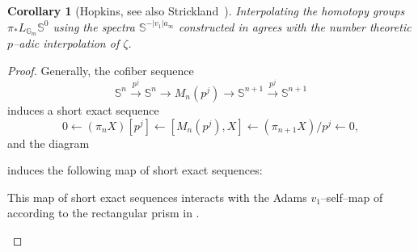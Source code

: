 \documentclass{amsart}
\renewcommand{\S}{\mathbb S}
\newcommand{\G}{\mathbb G}
\newcommand{\<}{\langle}
\renewcommand{\>}{\rangle}
\theoremstyle{plain}
\newtheorem*{corollary}{Corollary}
\theoremstyle{definition}
\theoremstyle{remark}
\begin{document}
\begin{corollary}[{Hopkins, see also Strickland~\cite{StricklandInterpolate}}]
Interpolating the homotopy groups $\pi_* L_{\G_m} \S^0$ using the spectra $\S^{-|v_1|a_\infty}$ constructed in  agrees with the number theoretic $p$--adic interpolation of $\zeta$.
\end{corollary}
\begin{proof}
Generally, the cofiber sequence \[\S^n \xrightarrow{p^j} \S^n \to M_n(p^j) \to \S^{n+1} \xrightarrow{p^j} \S^{n+1}\] induces a short exact sequence \[0 \leftarrow (\pi_n X) [p^j] \leftarrow [M_n(p^j), X] \leftarrow (\pi_{n+1} X) / p^j \leftarrow 0,\] and the diagram
\begin{center}
\end{center}
induces the following map of short exact sequences:
\begin{center}
\end{center}
This map of short exact sequences interacts with the Adams $v_1$--self--map of  according to the rectangular prism in .
\begin{sidewaysfigure}[ht]
\begin{center}
\end{center}
\end{sidewaysfigure}
\end{proof}
\end{document}
